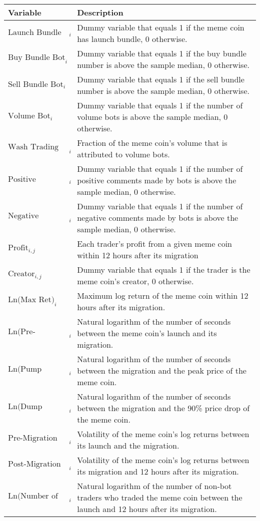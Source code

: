 \begin{tabularx}{\textwidth}{lX}\hline
Variable & Description \\
\hline
$\text{Launch Bundle Bot}_{i}$ & Dummy variable that equals 1 if the meme coin has launch bundle, 0 otherwise. \\
$\text{Buy Bundle Bot}_{i}$ & Dummy variable that equals 1 if the buy bundle number is above the sample median, 0 otherwise. \\
$\text{Sell Bundle Bot}_{i}$ & Dummy variable that equals 1 if the sell bundle number is above the sample median, 0 otherwise. \\
$\text{Volume Bot}_{i}$ & Dummy variable that equals 1 if the number of volume bots is above the sample median, 0 otherwise. \\
$\text{Wash Trading Volume \%}_{i}$ & Fraction of the meme coin's volume that is attributed to volume bots. \\
$\text{Positive Comment Bot}_{i}$ & Dummy variable that equals 1 if the number of positive comments made by bots is above the sample median, 0 otherwise. \\
$\text{Negative Comment Bot}_{i}$ & Dummy variable that equals 1 if the number of negative comments made by bots is above the sample median, 0 otherwise. \\
$\text{Profit}_{i,j}$ & Each trader's profit from a given meme coin within 12 hours after its migration \\
$\text{Creator}_{i,j}$ & Dummy variable that equals 1 if the trader is the meme coin's creator, 0 otherwise. \\
$\text{Ln(Max Ret)}_{i}$ & Maximum log return of the meme coin within 12 hours after its migration. \\
$\text{Ln(Pre-Migration Duration)}_{i}$ & Natural logarithm of the number of seconds between the meme coin's launch and its migration. \\
$\text{Ln(Pump Duration)}_{i}$ & Natural logarithm of the number of seconds between the migration and the peak price of the meme coin. \\
$\text{Ln(Dump Duration)}_{i}$ & Natural logarithm of the number of seconds between the migration and the 90\% price drop of the meme coin. \\
$\text{Pre-Migration Volatility}_{i}$ & Volatility of the meme coin's log returns between its launch and the migration. \\
$\text{Post-Migration Volatility}_{i}$ & Volatility of the meme coin's log returns between its migration and 12 hours after its migration. \\
$\text{Ln(Number of Traders)}_{i}$ & Natural logarithm of the number of non-bot traders who traded the meme coin between the launch and 12 hours after its migration. \\
\hline
\end{tabularx}

